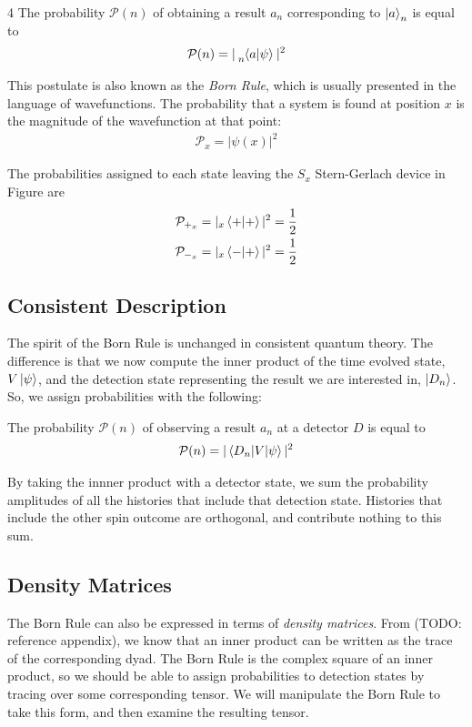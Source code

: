 \begin{Thm:Postulate}{4}
    The probability $\mathcal{P}(n)$ of obtaining a result $a_n$ corresponding to $\ket{a}_n$  is equal to
     \begin{align*}
        \mathcal{P}(n) = |\tensor[_n]{\braket{a|\psi}}{}|^2
    \end{align*}
\end{Thm:Postulate}

This postulate is also known as the \textit{Born Rule}, which is usually presented in the language of wavefunctions. The probability that a system is found at position $x$ is the magnitude of the wavefunction at that point:
\begin{align}
    \mathcal{P}_x = |\psi(x)|^2
\end{align}

The probabilities assigned to each state leaving the $S_x$ Stern-Gerlach device in Figure  are
\begin{align*}
    \mathcal{P}_{+_x} &= |_x\braket{+|+}|^2 = \frac{1}{2} \\
    \mathcal{P}_{-_x} &= |_x\braket{-|+}|^2 = \frac{1}{2}
\end{align*}
\subsection{Consistent Description}
The spirit of the Born Rule is unchanged in consistent quantum theory. The difference is that we now compute the inner product of the time evolved state, $V\ket{\psi}$, and the detection state representing the result we are interested in, $\ket{D_n}$. So, we assign probabilities with the following:

The probability $\mathcal{P}(n)$ of observing a result $a_n$ at a detector $D$ is equal to
\begin{align*}
  \mathcal{P}(n) = |\braket{D_n|V|\psi}|^2
\end{align*}

By taking the innner product with a detector state, we sum the probability amplitudes of all the histories that include that detection state. Histories that include the other spin outcome are orthogonal, and contribute nothing to this sum.

\subsection{Density Matrices}
The Born Rule can also be expressed in terms of \textit{density matrices}. From (TODO: reference appendix), we know that an inner product can be written as the trace of the corresponding dyad. The Born Rule is the complex square of an inner product, so we should be able to assign probabilities to detection states by tracing over some corresponding tensor. We will manipulate the Born Rule to take this form, and then examine the resulting tensor.

